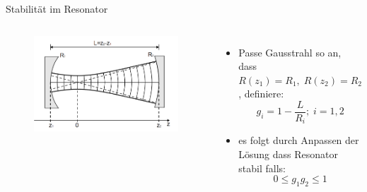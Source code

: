 \documentclass[10pt, aspectratio=169]{beamer}
\begin{document}
\begin{frame}{Stabilit\"at im Resonator}
  \begin{columns}
    \begin{figure}
      \includegraphics[width=1\columnwidth]{gauss-res.png}
    \end{figure}
    \begin{itemize}
    \item<1-> Passe Gausstrahl so an, dass
      \(R(z_1)=R_1,\; R(z_2)=R_2\), definiere:
      \begin{equation}
        \label{eq:gparams}
        g_i=1-\frac{L}{R_i};\; i=1,2
      \end{equation}
    \item<2-> es folgt durch Anpassen der L\"osung dass Resonator
      stabil falls:
      \begin{equation}
        \label{eq:stabbed}
        0\leq g_1g_2\leq 1
      \end{equation}
    \end{itemize}
  \end{columns}
\end{frame}
\end{document}
